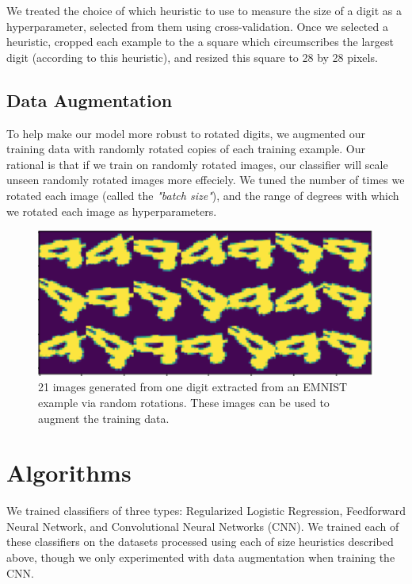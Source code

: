 \documentclass[letterpaper, 10 pt, conference]{ieeeconf}  %
\begin{document}
We treated the choice of which heuristic to use to measure the size of a digit as a hyperparameter, selected from them using cross-validation. Once we selected a heuristic, cropped each example to the a square which circumscribes the largest digit (according to this heuristic), and resized this square to 28 by 28 pixels. 

\subsection{Data Augmentation} 

To help make our model more robust to rotated digits, we augmented our training data with randomly rotated copies of each training example. Our rational is that if we train on randomly rotated images, our classifier will scale unseen randomly rotated images more effeciely. We tuned the number of times we rotated each image (called the \emph{"batch size"}), and the range of degrees with which we rotated each image as hyperparameters. 

\begin{figure}[H]
      \centering
      \includegraphics[scale = .7]{rotated_nines}
		\centering
      \caption{21 images generated from one digit extracted from an EMNIST example via random rotations. These images can be used to augment the training data.}
      \label{figurelabel}
   \end{figure}


\section{Algorithms}

We trained classifiers of three types: Regularized Logistic Regression, Feedforward Neural Network, and Convolutional Neural Networks (CNN). We trained each of these classifiers on the datasets processed using each of size heuristics described above, though we only experimented with data augmentation when training the CNN.
\end{document}
